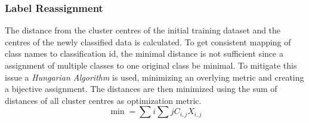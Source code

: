 \documentclass[12pt,a4paper, english,twoside]{article}
\begin{document}
    \subsubsection{Label Reassignment}
    The distance from the cluster centres of the initial training dataset and the centres of the newly classified data is calculated. 
    To get consistent mapping of class names to classification id, the minimal distance is not sufficient since a assignment of multiple classes to one original class be minimal. 
    To mitigate this issue a \textit{Hungarian Algorithm} is used, minimizing an overlying metric and creating a bijective assignment. 
    The distances are then minimized using the sum of distances of all cluster centres as optimization metric.
      \begin{equation}
        \min = \sum{i}\sum{j} C_{i,j}X_{i,j}
      \end{equation}
\end{document}
